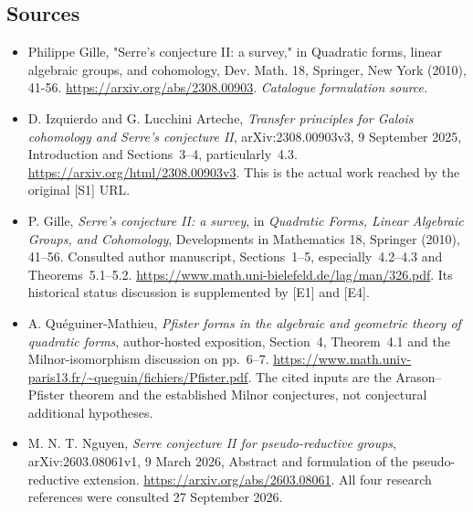 \documentclass[11pt,a4paper]{article}
\numberwithin{equation}{section}
\begin{document}
\subsection{Sources}
\begin{itemize}\raggedright
\item[\textnormal{[S1]}]\hypertarget{source:226:1}{} Philippe Gille, "Serre's conjecture II: a survey," in Quadratic forms, linear algebraic groups, and cohomology, Dev. Math. 18, Springer, New York (2010), 41-56.
\url{https://arxiv.org/abs/2308.00903}.
{\small\textit{Catalogue formulation source.}}
\item[\textnormal{[E1]}]\hypertarget{extra:226:1}{}
D. Izquierdo and G. Lucchini Arteche, \emph{Transfer principles for Galois
cohomology and Serre's conjecture II}, arXiv:2308.00903v3,
9 September 2025, Introduction and Sections~3--4, particularly~4.3.
\url{https://arxiv.org/html/2308.00903v3}.
This is the actual work reached by the original [S1] URL.
\item[\textnormal{[E2]}]\hypertarget{extra:226:2}{}
P. Gille, \emph{Serre's conjecture II: a survey}, in \emph{Quadratic Forms,
Linear Algebraic Groups, and Cohomology}, Developments in Mathematics
18, Springer (2010), 41--56. Consulted author manuscript,
Sections~1--5, especially~4.2--4.3 and Theorems~5.1--5.2.
\url{https://www.math.uni-bielefeld.de/lag/man/326.pdf}.
Its historical status discussion is supplemented by [E1] and [E4].
\item[\textnormal{[E3]}]\hypertarget{extra:226:3}{}
A. Qu\'eguiner-Mathieu, \emph{Pfister forms in the algebraic and geometric
theory of quadratic forms}, author-hosted exposition, Section~4,
Theorem~4.1 and the Milnor-isomorphism discussion on pp.~6--7.
\url{https://www.math.univ-paris13.fr/~queguin/fichiers/Pfister.pdf}.
The cited inputs are the Arason--Pfister theorem and the established
Milnor conjectures, not conjectural additional hypotheses.
\item[\textnormal{[E4]}]\hypertarget{extra:226:4}{}
M. N. T. Nguyen, \emph{Serre conjecture II for pseudo-reductive groups},
arXiv:2603.08061v1, 9 March 2026, Abstract and formulation of the
pseudo-reductive extension. \url{https://arxiv.org/abs/2603.08061}.
All four research references were consulted 27 September 2026.
\end{itemize}
\end{document}

